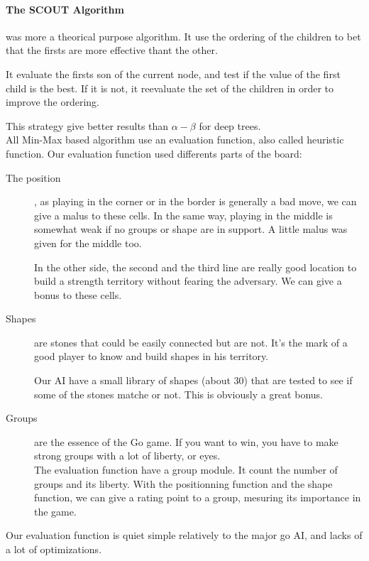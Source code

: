 \paragraph{The SCOUT Algorithm} was more a theorical purpose algorithm. It use the ordering of the children to bet that the firsts are more effective thant the other.

It evaluate the firsts son of the current node, and test if the value of the first child is the best. If it is not, it reevaluate the set of the children in order to improve the ordering.

This strategy give better results than $\alpha-\beta$ for deep trees.\\

All Min-Max based algorithm use an evaluation function, also called heuristic function.
Our evaluation function used differents parts of the board:
\begin{description}
\item[The position], as playing in the corner or in the border is generally a bad move, we can give a malus to these cells. In the same way, playing in the middle is somewhat weak if no groups or shape are in support. A little malus was given for the middle too.

In the other side, the second and the third line are really good location to build a strength territory without fearing the adversary. We can give a bonus to these cells.

\item[Shapes] are stones that could be easily connected but are not. It's the mark of a good player to know and build shapes in his territory.

Our AI have a small library of shapes (about 30) that are tested to see if some of the stones matche or not. This is obviously a great bonus.

\item[Groups] are the essence of the Go game. If you want to win, you have to make  strong groups with a lot of liberty, or eyes.\\
The evaluation function have a group module. It count the number of groups and its liberty. With the positionning function and the shape function, we can give a rating point to a group, mesuring its importance in the game.
\end{description}

Our evaluation function is quiet simple relatively to the major go AI, and lacks of a lot of optimizations.

